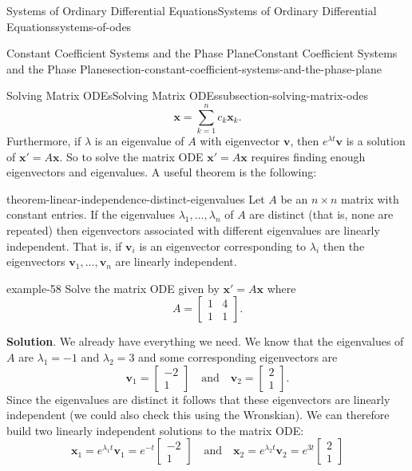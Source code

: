 \documentclass[oneside,10pt,]{book}
\numberwithin{equation}{section}
\renewcommand{\vec}[1]{\mathbf{#1}}
\newcommand{\qq}[1]{\quad\text{#1}\quad}
\newcommand{\amp}{&}
\begin{document}
\begin{chapterptx}{Systems of Ordinary Differential Equations}{}{Systems of Ordinary Differential Equations}{}{}{systems-of-odes}
\begin{sectionptx}{Constant Coefficient Systems and the Phase Plane}{}{Constant Coefficient Systems and the Phase Plane}{}{}{section-constant-coefficient-systems-and-the-phase-plane}
\begin{subsectionptx}{Solving Matrix ODEs}{}{Solving Matrix ODEs}{}{}{subsection-solving-matrix-odes}
\begin{equation*}
\vec{x} = \sum_{k=1}^{n}c_{k}\vec{x}_{k}.
\end{equation*}
Furthermore, if \(\lambda\) is an eigenvalue of \(A\) with eigenvector \(\vec{v}\), then \(e^{\lambda t}\vec{v}\) is a solution of \(\vec{x}'=A\vec{x}\). So to solve the matrix ODE \(\vec{x}'=A\vec{x}\) requires finding enough eigenvectors and eigenvalues. A useful theorem is the following:%
\begin{theorem}{}{}{theorem-linear-independence-distinct-eigenvalues}%
\hypertarget{p-344}{}%
Let \(A\) be an \(n\times n\) matrix with constant entries. If the eigenvalues \(\lambda_{1},\ldots,\lambda_{n}\) of \(A\) are distinct (that is, none are repeated) then eigenvectors associated with different eigenvalues are linearly independent. That is, if \(\vec{v}_{i}\) is an eigenvector corresponding to \(\lambda_{i}\) then the eigenvectors \(\vec{v}_{1},\ldots,\vec{v}_{n}\) are linearly independent.%
\end{theorem}
\begin{example}{}{example-58}%
\hypertarget{p-345}{}%
Solve the matrix ODE given by \(\vec{x}' = A\vec{x}\) where%
\begin{equation*}
A = \begin{bmatrix}1\amp 4\\1\amp 1\end{bmatrix}.
\end{equation*}
%
\par\smallskip%
\noindent\textbf{Solution}.\hypertarget{solution-55}{}\quad%
\hypertarget{p-346}{}%
We already have everything we need. We know that the eigenvalues of \(A\) are \(\lambda_{1}=-1\) and \(\lambda_{2}=3\) and some corresponding eigenvectors are%
\begin{equation*}
\vec{v}_{1} = \begin{bmatrix}-2\\1\end{bmatrix}\qq{and} \vec{v}_{2} = \begin{bmatrix}2\\1\end{bmatrix}.
\end{equation*}
Since the eigenvalues are distinct it follows that these eigenvectors are linearly independent (we could also check this using the Wronskian). We can therefore build two linearly independent solutions to the matrix ODE:%
\begin{equation*}
\vec{x}_{1} = e^{\lambda_{1}t}\vec{v}_{1} = e^{-t}\begin{bmatrix}-2\\1\end{bmatrix}\qq{and} \vec{x}_{2} = e^{\lambda_{2}t}\vec{v}_{2} = e^{3t}\begin{bmatrix}2\\1\end{bmatrix}

\end{equation*}
\end{example}
\end{subsectionptx}
\end{sectionptx}
\end{chapterptx}
\end{document}
